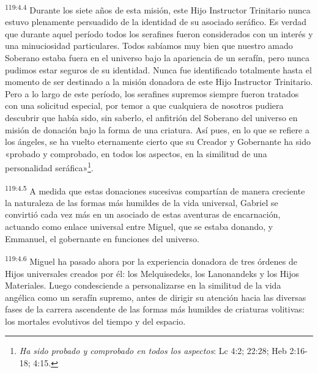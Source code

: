 \par
\textsuperscript{119:4.4} Durante los siete años de esta misión, este Hijo Instructor Trinitario nunca estuvo plenamente persuadido de la identidad de su asociado seráfico. Es verdad que durante aquel período todos los serafines fueron considerados con un interés y una minuciosidad particulares. Todos sabíamos muy bien que nuestro amado Soberano estaba fuera en el universo bajo la apariencia de un serafín, pero nunca pudimos estar seguros de su identidad. Nunca fue identificado totalmente hasta el momento de ser destinado a la misión donadora de este Hijo Instructor Trinitario. Pero a lo largo de este período, los serafines supremos siempre fueron tratados con una solicitud especial, por temor a que cualquiera de nosotros pudiera descubrir que había sido, sin saberlo, el anfitrión del Soberano del universo en misión de donación bajo la forma de una criatura. Así pues, en lo que se refiere a los ángeles, se ha vuelto eternamente cierto que su Creador y Gobernante ha sido «probado y comprobado, en todos los aspectos, en la similitud de una personalidad seráfica»\footnote{\textit{Ha sido probado y comprobado en todos los aspectos}: Lc 4:2; 22:28; Heb 2:16-18; 4:15.}.

\par
\textsuperscript{119:4.5} A medida que estas donaciones sucesivas compartían de manera creciente la naturaleza de las formas más humildes de la vida universal, Gabriel se convirtió cada vez más en un asociado de estas aventuras de encarnación, actuando como enlace universal entre Miguel, que se estaba donando, y Emmanuel, el gobernante en funciones del universo.

\par
\textsuperscript{119:4.6} Miguel ha pasado ahora por la experiencia donadora de tres órdenes de Hijos universales creados por él: los Melquisedeks, los Lanonandeks y los Hijos Materiales. Luego condesciende a personalizarse en la similitud de la vida angélica como un serafín supremo, antes de dirigir su atención hacia las diversas fases de la carrera ascendente de las formas más humildes de criaturas volitivas: los mortales evolutivos del tiempo y del espacio.

